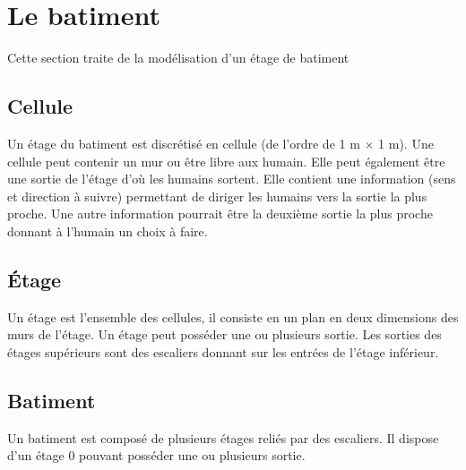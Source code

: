 %
\section{Le batiment}
%
Cette section traite de la modélisation d'un étage de batiment
%
\subsection{Cellule}
Un étage du batiment est discrétisé en cellule (de l'ordre de 1 m $\times$ 1 m). Une cellule peut contenir un mur ou être libre aux humain. Elle peut également être une sortie de l'étage d'où les humains sortent. Elle contient une information (sens et direction à suivre) permettant de diriger les humains vers la sortie la plus proche. Une autre information pourrait être la deuxième sortie la plus proche donnant à l'humain un choix à faire.
%
%
\subsection{Étage}
Un étage est l'ensemble des cellules, il consiste en un plan en deux dimensions des murs de l'étage. Un étage peut posséder une ou plusieurs sortie. Les sorties des étages supérieurs sont des escaliers donnant sur les entrées de l'étage inférieur.
%
%
\subsection{Batiment}
Un batiment est composé de plusieurs étages reliés par des escaliers. Il dispose d'un étage 0 pouvant posséder une ou plusieurs sortie.

